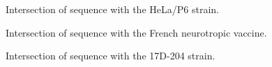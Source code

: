 \documentclass{report}
\begin{document}
\begin{table}
	\caption{Nonsynonymous variants in the Asibi Genome.}
	\begin{ThreePartTable}
	
		\begin{tablenotes}
			\item[a]Intersection of sequence with the HeLa/P6 strain.
			\item[b]Intersection of sequence with the French neurotropic vaccine.
			\item[c]Intersection of sequence with the 17D-204 strain.
		\end{tablenotes}
	\end{ThreePartTable}
\end{table}
\end{document}

